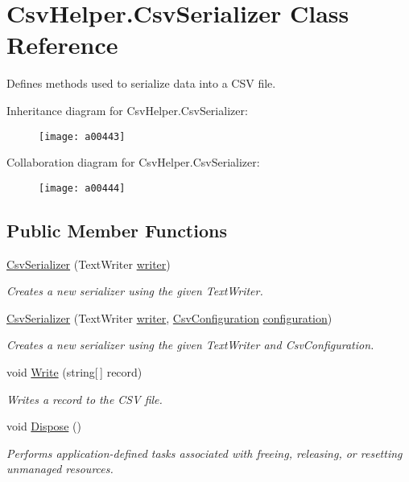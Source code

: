 \hypertarget{a00079}{\section{Csv\-Helper.\-Csv\-Serializer Class Reference}
\label{a00079}
}


Defines methods used to serialize data into a C\-S\-V file.  




Inheritance diagram for Csv\-Helper.\-Csv\-Serializer\-:
\nopagebreak
\begin{figure}[H]
\begin{center}
\leavevmode
\texttt{[image: a00443]}
\end{center}
\end{figure}


Collaboration diagram for Csv\-Helper.\-Csv\-Serializer\-:
\nopagebreak
\begin{figure}[H]
\begin{center}
\leavevmode
\texttt{[image: a00444]}
\end{center}
\end{figure}
\subsection*{Public Member Functions}
\begin{DoxyCompactItemize}
\item 
\hyperlink{a00079_a74ea10f7aaea0a478087d8ff6182f38c}{Csv\-Serializer} (Text\-Writer \hyperlink{a00079_adfb235fa2c868fc79c0376fd12fda767}{writer})
\begin{DoxyCompactList}\small\item\em Creates a new serializer using the given Text\-Writer. \end{DoxyCompactList}\item 
\hyperlink{a00079_ab14fe4a4f630ce97d57c27e2ee050fac}{Csv\-Serializer} (Text\-Writer \hyperlink{a00079_adfb235fa2c868fc79c0376fd12fda767}{writer}, \hyperlink{a00063}{Csv\-Configuration} \hyperlink{a00079_ae8c56ff97c0a797245f2205c486833ea}{configuration})
\begin{DoxyCompactList}\small\item\em Creates a new serializer using the given Text\-Writer and Csv\-Configuration. \end{DoxyCompactList}\item 
void \hyperlink{a00079_aefad906acd048863d3dd414651a44793}{Write} (string\mbox{[}$\,$\mbox{]} record)
\begin{DoxyCompactList}\small\item\em Writes a record to the C\-S\-V file. \end{DoxyCompactList}\item 
void \hyperlink{a00079_a9d0e8b3508b377a7f978da2394b09e36}{Dispose} ()
\begin{DoxyCompactList}\small\item\em Performs application-\/defined tasks associated with freeing, releasing, or resetting unmanaged resources. \end{DoxyCompactList}\end{DoxyCompactItemize}
